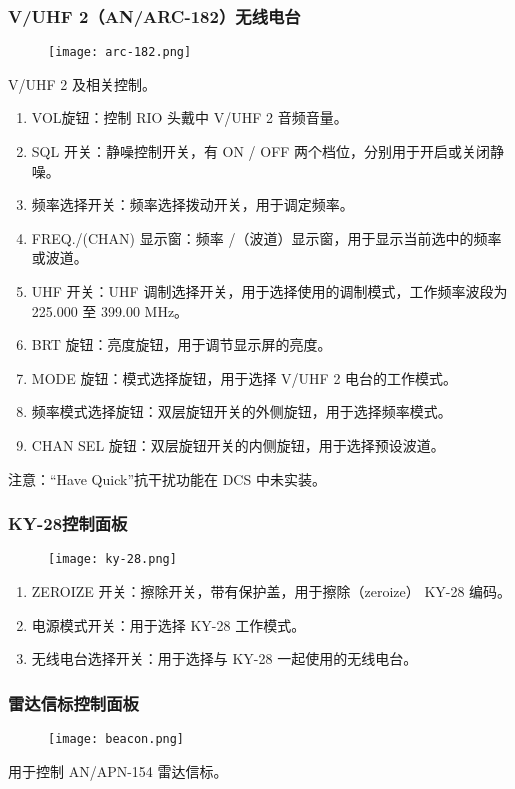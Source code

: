\subsubsection{V/UHF 2（AN/ARC-182）无线电台}
\begin{figure}[htb]
	\centering
	\texttt{[image: arc-182.png]}
\end{figure}
V/UHF 2 及相关控制。

\begin{enumerate}
	\item VOL旋钮：控制 RIO 头戴中 V/UHF 2 音频音量。
	\item SQL 开关：静噪控制开关，有 ON / OFF 两个档位，分别用于开启或关闭静噪。
	\item 频率选择开关：频率选择拨动开关，用于调定频率。
	\item FREQ./(CHAN) 显示窗：频率 /（波道）显示窗，用于显示当前选中的频率或波道。
	\item UHF 开关：UHF 调制选择开关，用于选择使用的调制模式，工作频率波段为 225.000 至 399.00 MHz。
	\item BRT 旋钮：亮度旋钮，用于调节显示屏的亮度。
	\item MODE 旋钮：模式选择旋钮，用于选择 V/UHF 2 电台的工作模式。
	\item 频率模式选择旋钮：双层旋钮开关的外侧旋钮，用于选择频率模式。
	\item CHAN SEL 旋钮：双层旋钮开关的内侧旋钮，用于选择预设波道。
\end{enumerate}
注意：“Have Quick”抗干扰功能在 DCS 中未实装。

\subsubsection{KY-28控制面板}
\begin{figure}[htb]
	\centering
	\texttt{[image: ky-28.png]}
\end{figure}

\begin{enumerate}
	\item ZEROIZE 开关：擦除开关，带有保护盖，用于擦除（zeroize） KY-28 编码。
	\item 电源模式开关：用于选择 KY-28 工作模式。
	\item 无线电台选择开关：用于选择与 KY-28 一起使用的无线电台。
\end{enumerate}

\subsubsection{雷达信标控制面板}
\begin{figure}[htb]
	\centering
	\texttt{[image: beacon.png]}
\end{figure}
用于控制 AN/APN-154 雷达信标。


